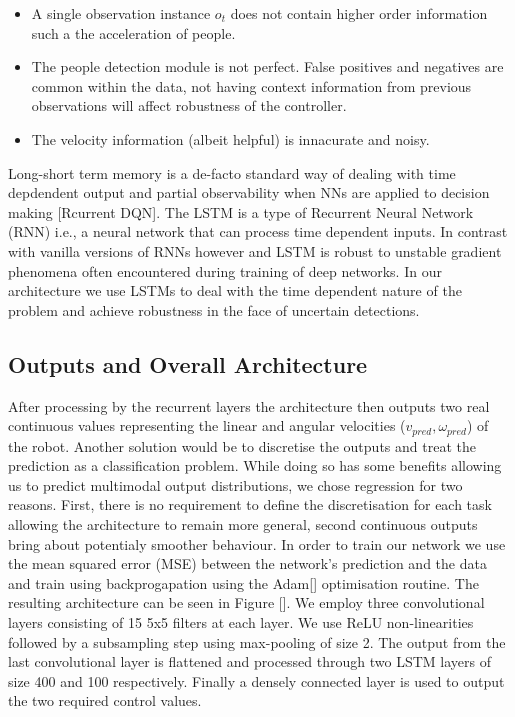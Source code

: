 \documentclass[letterpaper, 10 pt, conference]{ieeeconf}
\begin{document}
\begin{itemize}
\item A single observation instance $o_t$ does not contain higher order information such a the acceleration of people.
\item The people detection module is not perfect. False positives and negatives are common within the data, not having context information from previous observations will affect robustness of the controller.
\item The velocity information (albeit helpful) is innacurate and noisy.
\end{itemize}

Long-short term memory is a de-facto standard way of dealing with time depdendent output and partial observability when NNs are applied to decision making [Rcurrent DQN]. The LSTM is a type of Recurrent Neural Network (RNN) i.e., a neural network that can process time dependent inputs. In contrast with vanilla versions of RNNs however and LSTM is robust to unstable gradient phenomena often encountered during training of deep networks. In our architecture we use LSTMs to deal with the time dependent nature of the problem and achieve robustness in the face of uncertain detections.



\subsection{Outputs and Overall Architecture}
After processing by the recurrent layers the architecture then outputs two real continuous values representing the linear and angular velocities ($v_{pred},\omega_{pred}$) of the robot. Another solution would be to discretise the outputs and treat the prediction as a classification problem. While doing so has some benefits allowing us to predict multimodal output distributions, we chose regression for two reasons. First, there is no requirement to define the discretisation for each task allowing the architecture to remain more general, second continuous outputs bring about potentialy smoother behaviour. In order to train our network we use the mean squared error (MSE) between the network's prediction and the data and train using backprogapation using the Adam[] optimisation routine. The resulting architecture can be seen in Figure []. We employ three convolutional layers consisting of 15 5x5 filters at each layer. We use ReLU non-linearities followed by a subsampling step using max-pooling of size 2. The output from the last convolutional layer is flattened and processed through two LSTM layers of size 400 and 100 respectively. Finally a densely connected layer is used to output the two required control values. 
\end{document}
